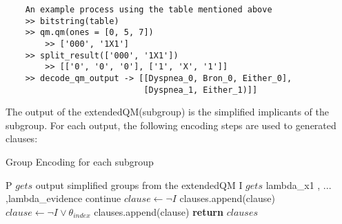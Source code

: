     \begin{lstlisting}
    An example process using the table mentioned above
    >> bitstring(table)
    >> qm.qm(ones = [0, 5, 7])
        >> ['000', '1X1']
    >> split_result(['000', '1X1'])
        >> [['0', '0', '0'], ['1', 'X', '1']]
    >> decode_qm_output -> [[Dyspnea_0, Bron_0, Either_0],
                            [Dyspnea_1, Either_1)]]
    \end{lstlisting}
    
    The output of the extendedQM(subgroup) is the simplified implicants of the subgroup. For each output, the following encoding steps are used to generated clauses:
    
    \begin{algorithm}
    \caption{Group Encoding for each subgroup}\label{algorithm:group encoding}
    \begin{algorithmic}[1]
        \State P $gets$ output simplified groups from the extendedQM
        \State  I $gets$ lambda\_x1 , ... ,lambda\_evidence
                \State continue
            \EndIf
                \State $clause \gets \neg I$
                \State clauses.append(clause)
            \Else
                \State $clause \gets \neg I \vee \theta_{index}$
                \State clauses.append(clause)
            \EndIf
        \EndFor
    \EndFor
    \State \textbf{return} $clauses$
    \EndProcedure
    \end{algorithmic}
    \end{algorithm}

  
